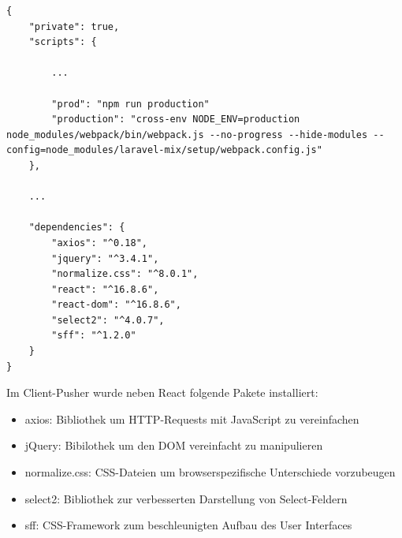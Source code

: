             \begin{lstlisting}[caption=Ausschnitt package.json des Client-Pushers]
{
    "private": true,
    "scripts": {
    
        ...
        
        "prod": "npm run production"
        "production": "cross-env NODE_ENV=production node_modules/webpack/bin/webpack.js --no-progress --hide-modules --config=node_modules/laravel-mix/setup/webpack.config.js"
    },
   
    ...
    
    "dependencies": {
        "axios": "^0.18",
        "jquery": "^3.4.1",
        "normalize.css": "^8.0.1",
        "react": "^16.8.6",
        "react-dom": "^16.8.6",
        "select2": "^4.0.7",
        "sff": "^1.2.0"
    }
}
        \end{lstlisting}
        
        Im Client-Pusher wurde neben React folgende Pakete installiert:
        
        \begin{itemize}
            \item axios: Bibliothek um HTTP-Requests mit JavaScript zu vereinfachen
            \item jQuery: Bibilothek um den DOM vereinfacht zu manipulieren
            \item normalize.css: CSS-Dateien um browserspezifische Unterschiede vorzubeugen
            \item select2: Bibliothek zur verbesserten Darstellung von Select-Feldern
            \item sff: CSS-Framework zum beschleunigten Aufbau des User Interfaces
        \end{itemize}